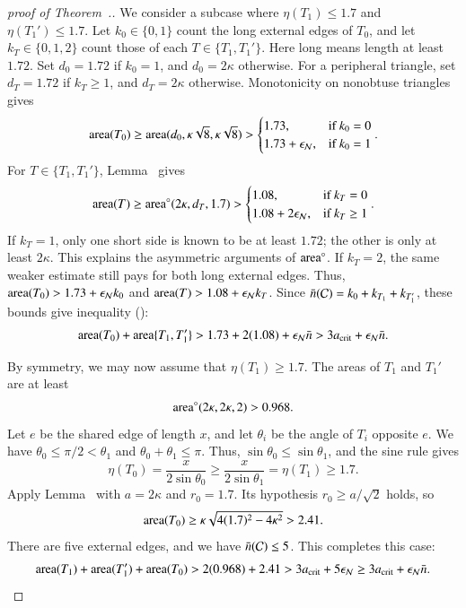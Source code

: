 \begin{proof}[proof of Theorem~.]
We consider a subcase where $\eta(T_1)\le1.7$ and
$\eta(T_1')\le1.7$.  Let $k_0\in\{0,1\}$ count the long external
edges of $T_0$, and let $k_T\in\{0,1,2\}$ count those of each
$T\in\{T_1,T_1'\}$.  Here long means length at least $1.72$.
Set $d_0=1.72$ if $k_0=1$, and $d_0=2\kappa$ otherwise.
For a peripheral triangle, set $d_T=1.72$ if $k_T\ge1$, and
$d_T=2\kappa$ otherwise.  Monotonicity on nonobtuse triangles gives
\[
{\operatorname{area}}(T_0) \ge {\operatorname{area}}(d_0,\kappa\sqrt{8},\kappa\sqrt{8}) >
   \begin{cases}1.73,&\text{if } k_0=0\\
     1.73+\epsilon_{\mathcal N}, & \text{if } k_0=1 \end{cases}.
\]
For $T\in\{T_1,T_1'\}$,
Lemma~ gives
\begin{equation}\libel{eqn:173}
\area(T) \ge \areta(2\kappa,d_T,1.7) >
   \begin{cases}1.08,&\text{if } k_T=0\\
     1.08+2\epsN, & \text{if } k_T\ge1 \end{cases}.
\end{equation}
If $k_T=1$, only one short side is known to be at least $1.72$;
the other is only at least $2\kappa$.  This explains the asymmetric
arguments of ${\operatorname{area}}^\circ$.  If $k_T=2$, the same weaker estimate still
pays for both long external edges.  Thus,
${\operatorname{area}}(T_0)>1.73+\epsilon_{\mathcal N} k_0$ and
${\operatorname{area}}(T)>1.08+\epsilon_{\mathcal N} k_T$.  Since
$\bar n(\mathcal C)=k_0+k_{T_1}+k_{T_1'}$, these bounds give
inequality ():
\[
{\operatorname{area}}(T_0) +{\operatorname{area}}\{T_1,T_1'\}  > 1.73 + 2(1.08) + \epsilon_{\mathcal N} \bar n > 
3 a_\text{crit} +  \epsilon_{\mathcal N} \bar n.
\]

By symmetry, we may now assume that $\eta(T_1) \ge 1.7$.  
The areas of $T_1$ and $T_1'$ are at least
\begin{equation}\libel{eqn:968}
\areta(2\kappa,2\kappa,2) > 0.968.
\end{equation}
Let $e$ be the shared edge of length $x$, and let $\theta_i$ be the angle of
$T_i$ opposite $e$.  We have $\theta_0\le\pi/2<\theta_1$ and
$\theta_0+\theta_1\le\pi$.  Thus,
$\sin\theta_0\le\sin\theta_1$, and the sine rule gives
\[
\eta(T_0)=\frac{x}{2\sin\theta_0}
\ge\frac{x}{2\sin\theta_1}=\eta(T_1)\ge1.7.
\]
Apply Lemma~ with $a=2\kappa$
and $r_0=1.7$.  Its hypothesis $r_0\ge a/\sqrt2$ holds, so
\[
{\operatorname{area}}(T_0)\ge\kappa\sqrt{4(1.7)^2-4\kappa^2}>2.41.
\]
There are five external edges, and we have $\bar n(\mathcal C)\le 5$.
This completes this case:
\[
{\operatorname{area}}(T_1) + {\operatorname{area}}(T_1') + {\operatorname{area}}(T_0) 
>
2(0.968) + 2.41 > 3a_\text{crit} + 5 \epsilon_{\mathcal N} \ge 3a_\text{crit} + \epsilon_{\mathcal N} \bar n.
\] 


\end{proof}
